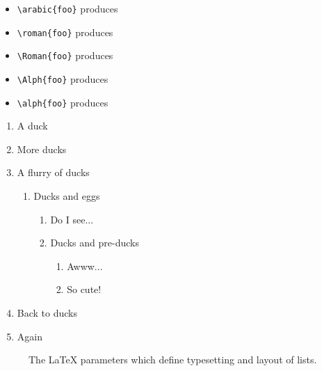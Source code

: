 \documentclass{article}
\begin{document}
	\begin{itemize}
		\item \verb|| produces \arabic{foo}
		\item \verb|| produces \roman{foo} 
		\item \verb|| produces \Roman{foo}
		\item \verb|| produces \Alph{foo}
		\item \verb|| produces \alph{foo}
	\end{itemize}
	
	
	\begin{enumerate}
		\item A duck
		\item More ducks
		\item A flurry of ducks
		\begin{enumerate}
			\item Ducks and eggs
			\begin{enumerate}
				\item Do I see... 
				\item Ducks and pre-ducks 
				\begin{enumerate}
					\item Awww...
					\item So cute!
				\end{enumerate}
			\end{enumerate}
		\end{enumerate}
		\item Back to ducks
		\item Again
	\end{enumerate}
	
	\begin{figure}
		\listdiagram  %
		\caption{The \LaTeX{} parameters which define typesetting and layout of lists.} 
	\end{figure}
	
	\newcommand{\makeboxlabel}[1]{\fbox{#1.}\hfill}%
	\newenvironment{boxlabel}
	{\begin{list}
			{\arabic{boxlblcounter}}
			{\usecounter{boxlblcounter}
				\setlength{\labelwidth}{3em}
				\setlength{\labelsep}{0em}
				\setlength{\itemsep}{2pt}
				\setlength{\leftmargin}{1.5cm}
				\setlength{\rightmargin}{2cm}
				\setlength{\itemindent}{0em} 
				\let\makelabel=\makeboxlabel
			}
		}
		{\end{list}}
	
\end{document}
